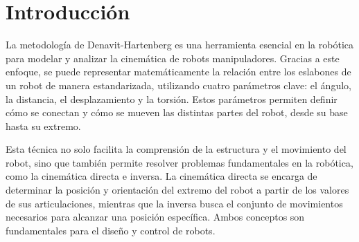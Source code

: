 \section{Introducción}
La metodología de Denavit-Hartenberg es una herramienta esencial en la robótica para modelar y analizar la cinemática de robots manipuladores. Gracias a este enfoque, se puede representar matemáticamente la relación entre los eslabones de un robot de manera estandarizada, utilizando cuatro parámetros clave: el ángulo, la distancia, el desplazamiento y la torsión. Estos parámetros permiten definir cómo se conectan y cómo se mueven las distintas partes del robot, desde su base hasta su extremo.

Esta técnica no solo facilita la comprensión de la estructura y el movimiento del robot, sino que también permite resolver problemas fundamentales en la robótica, como la cinemática directa e inversa. La cinemática directa se encarga de determinar la posición y orientación del extremo del robot a partir de los valores de sus articulaciones, mientras que la inversa busca el conjunto de movimientos necesarios para alcanzar una posición específica. Ambos conceptos son fundamentales para el diseño y control de robots.
